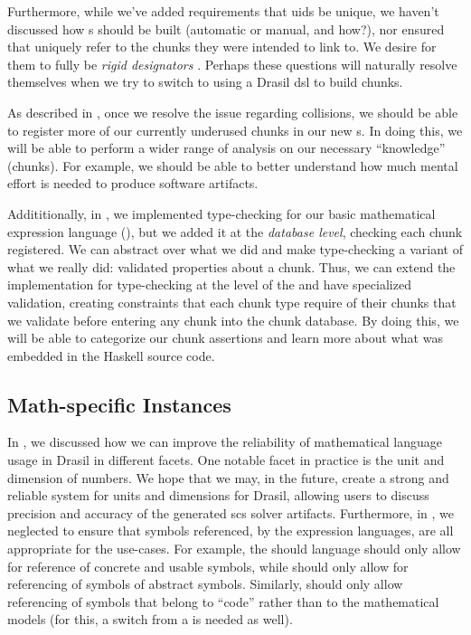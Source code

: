 Furthermore, while we've added requirements that \acsp{uid} be unique, we
haven't discussed how \UID{}s should be built (automatic or manual, and how?),
nor ensured that \UID{} uniquely refer to the chunks they were intended to link
to. We desire for them to fully be \textit{rigid designators}
\cite{Kripke1972NandN}. Perhaps these questions will naturally resolve
themselves when we try to switch to using a Drasil \acs{dsl} to build chunks.

As described in , once we resolve the issue regarding
\UID{} collisions, we should be able to register more of our currently underused
chunks in our new \ChunkDB{}s. In doing this, we will be able to perform a wider
range of analysis on our necessary ``knowledge'' (chunks). For example, we
should be able to better understand how much mental effort is needed to produce
software artifacts.

Addititionally, in
,
we implemented type-checking for our basic mathematical expression language
(\Expr{}), but we added it at the \textit{database level}, checking each chunk
registered. We can abstract over what we did and make type-checking a variant of
what we really did: validated properties about a chunk. Thus, we can extend the
implementation for type-checking at the level of the \ChunkDB{} and have
specialized validation, creating constraints that each chunk type require of
their chunks that we validate before entering any chunk into the chunk database.
By doing this, we will be able to categorize our chunk assertions and learn more
about what was embedded in the Haskell source code.

\subsection{Math-specific Instances}
\label{chap:futureWork:sec:chunks:sub:mathSpecific}

In , we discussed how we can improve the
reliability of mathematical language usage in Drasil in different facets. One
notable facet in practice is the unit and dimension of numbers. We hope that we
may, in the future, create a strong and reliable system for units and dimensions
for Drasil, allowing users to discuss precision and accuracy of the generated
\acs{scs} solver artifacts. Furthermore, in , we neglected
to ensure that symbols referenced, by the expression languages, are all
appropriate for the use-cases. For example, the \Expr{} should language should
only allow for reference of concrete and usable symbols, while \ModelExpr{}
should only allow for referencing of symbols of abstract symbols. Similarly,
\CodeExpr{} should only allow referencing of symbols that belong to ``code''
rather than to the mathematical models (for this, a switch from a
\QuantityDict{} is needed as well).

